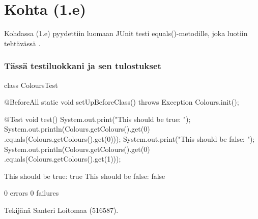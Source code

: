 \pagebreak

\section{Kohta (1.e)}

\label{Kohta (1.e)}

Kohdassa (1.e) pyydettiin luomaan JUnit testi equals()-metodille, joka luotiin tehtävässä \cite{Kohta (1.b)}.

\subsubsection{Tässä testiluokkani ja sen tulostukset}

\label{Tässä testiluokkani ja sen tulostukset}
\begin{javacode}
class ColoursTest {

	@BeforeAll
	static void setUpBeforeClass() throws Exception {
		Colours.init();
	}

	@Test
	void test() {
		System.out.print("This should be true: ");
		System.out.println(Colours.getColours().get(0)
			.equals(Colours.getColours().get(0)));
		System.out.print("This should be false: ");
		System.out.println(Colours.getColours().get(0)
			.equals(Colours.getColours().get(1)));
	}

}

This should be true: true
This should be false: false

0 errors 0 failures
\end{javacode}

Tekijänä Santeri Loitomaa (516587).